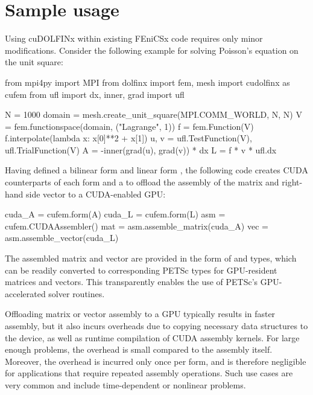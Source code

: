 \section*{Sample usage}

Using cuDOLFINx within existing FEniCSx code requires only minor modifications. Consider the following example for solving Poisson's equation on the unit square:
\begin{python}
from mpi4py import MPI
from dolfinx import fem, mesh
import cudolfinx as cufem
from ufl import dx, inner, grad
import ufl

N = 1000
domain = mesh.create_unit_square(MPI.COMM_WORLD, N, N)
V = fem.functionspace(domain, ("Lagrange", 1))
f = fem.Function(V)
f.interpolate(lambda x: x[0]**2 + x[1])
u, v = ufl.TestFunction(V), ufl.TrialFunction(V)
A = -inner(grad(u), grad(v)) * dx
L = f * v * ufl.dx
\end{python}
Having defined a bilinear form  and linear form , the following code creates CUDA counterparts of each form and a  to offload the assembly of the matrix and right-hand side vector to a CUDA-enabled GPU:
\begin{python}
cuda_A = cufem.form(A)
cuda_L = cufem.form(L)
asm = cufem.CUDAAssembler()
mat = asm.assemble_matrix(cuda_A)
vec = asm.assemble_vector(cuda_L)
\end{python}
The assembled matrix and vector are provided in the form of  and  types, which can be readily converted to corresponding PETSc types for GPU-resident matrices and vectors. This transparently enables the use of PETSc's GPU-accelerated solver routines.


Offloading matrix or vector assembly to a GPU typically results in faster assembly, but it also incurs overheads due to copying necessary data structures to the device, as well as runtime compilation of CUDA assembly kernels. For large enough problems, the overhead is small compared to the assembly itself. Moreover, the overhead is incurred only once per form, and is therefore negligible for applications that require repeated assembly operations. Such use cases are very common and include time-dependent or nonlinear problems.

